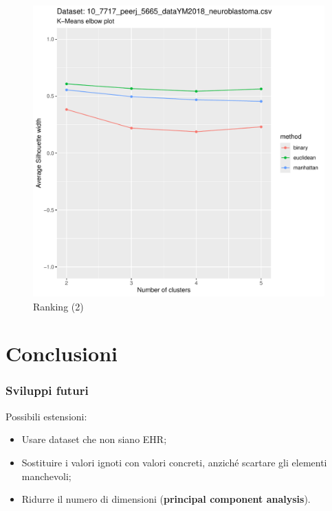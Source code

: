 \documentclass{beamer}
\begin{document}
\begin{frame}
\begin{boxedminipage}{0.49\textwidth}
\begin{figure}
                    \includegraphics[width = \textwidth, page = 10]{results/results_Neuroblastoma.csv.pdf}
                    \caption{Ranking (2)}
                \end{figure}
            \end{boxedminipage}
        \end{frame}

    \section{Conclusioni}

        \begin{frame}
            \frametitle{Sviluppi futuri}

            Possibili estensioni:

            \begin{itemize}
                \item Usare dataset che non siano EHR;
                \item Sostituire i valori ignoti con valori concreti, anziché scartare gli elementi manchevoli;
                \item Ridurre il numero di dimensioni (\textbf{principal component analysis}).
            \end{itemize}
        \end{frame}
\end{document}

